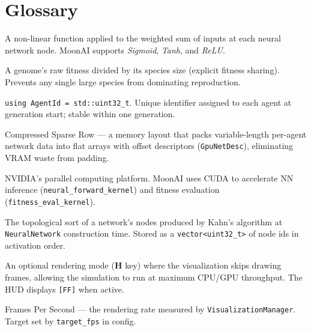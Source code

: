 \section{Glossary}
\label{sec:glossary}

\begin{description}[style=nextline,leftmargin=4.5cm,font=\ttfamily\bfseries]

  \item[Activation function]
    A non-linear function applied to the weighted sum of inputs at each neural network
    node.  MoonAI supports \emph{Sigmoid}, \emph{Tanh}, and \emph{ReLU}.

  \item[Adjusted fitness]
    A genome's raw fitness divided by its species size (explicit fitness sharing).
    Prevents any single large species from dominating reproduction.

  \item[AgentId]
    \texttt{using AgentId = std::uint32\_t}.  Unique identifier assigned to each agent
    at generation start; stable within one generation.

  \item[CSR]
    Compressed Sparse Row — a memory layout that packs variable-length per-agent network
    data into flat arrays with offset descriptors (\texttt{GpuNetDesc}), eliminating
    VRAM waste from padding.

  \item[CUDA]
    NVIDIA's parallel computing platform.  MoonAI uses CUDA to accelerate NN inference
    (\texttt{neural\_forward\_kernel}) and fitness evaluation
    (\texttt{fitness\_eval\_kernel}).

  \item[eval\_order]
    The topological sort of a network's nodes produced by Kahn's algorithm at
    \texttt{NeuralNetwork} construction time.  Stored as a \texttt{vector<uint32\_t>}
    of node ids in activation order.

  \item[Fast-forward mode]
    An optional rendering mode (\textbf{H} key) where the visualization skips drawing
    frames, allowing the simulation to run at maximum CPU/GPU throughput.  The HUD
    displays \texttt{[FF]} when active.

  \item[FPS]
    Frames Per Second — the rendering rate measured by \texttt{VisualizationManager}.
    Target set by \texttt{target\_fps} in config.


\end{description}
